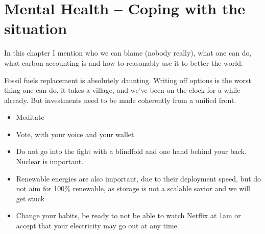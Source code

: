 \setchapterpreamble[u]{\margintoc}
\chapter{Mental Health -- Coping with the situation}

In this chapter I mention who we can blame (nobody really), what one can do, what carbon accounting is and how to reasonably use it to better the world.

Fossil fuels replacement is absolutely daunting. Writing off options is the worst thing one can do, it takes a village, and we’ve been on the clock for a while already. But investments need to be made coherently from a unified front.

\begin{itemize}
\item Meditate
\item Vote, with your voice and your wallet
\item Do not go into the fight with a blindfold and one hand behind your back. Nuclear is important.
\item Renewable energies are also important, due to their deployment speed, but do not aim for 100\% renewable, as storage is not a scalable savior and we will get stuck
\item Change your habits, be ready to not be able to watch Netflix at 1am or accept that your electricity may go out at any time.
\end{itemize}


